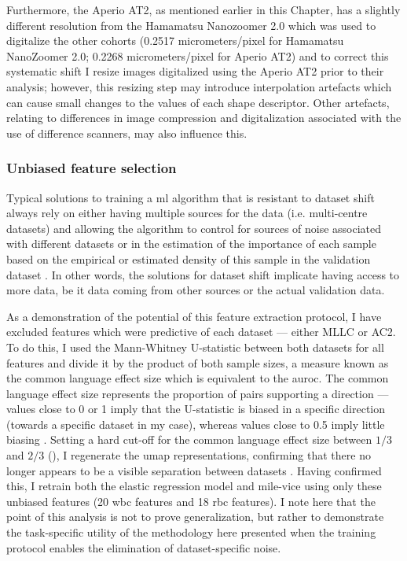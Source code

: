 Furthermore, the Aperio AT2, as mentioned earlier in this Chapter, has a slightly different resolution from the Hamamatsu Nanozoomer 2.0 which was used to digitalize the other cohorts (0.2517 micrometers/pixel for Hamamatsu NanoZoomer 2.0; 0.2268 micrometers/pixel for Aperio AT2) and to correct this systematic shift I resize images digitalized using the Aperio AT2 prior to their analysis; however, this resizing step may introduce interpolation artefacts which can cause small changes to the values of each shape descriptor. Other artefacts, relating to differences in image compression and digitalization associated with the use of difference scanners, may also influence this.

\subsubsection{Unbiased feature selection} 

Typical solutions to training a \ac{ml} algorithm that is resistant to dataset shift always rely on either having multiple sources for the data (i.e. multi-centre datasets) and allowing the algorithm to control for sources of noise associated with different datasets or in the estimation of the importance of each sample based on the empirical or estimated density of this sample in the validation dataset \cite{Y2019-vc}. In other words, the solutions for dataset shift implicate having access to more data, be it data coming from other sources or the actual validation data.

As a demonstration of the potential of this feature extraction protocol, I have excluded features which were predictive of each dataset --- either MLLC or AC2. To do this, I used the Mann-Whitney U-statistic between both datasets for all features and divide it by the product of both sample sizes, a measure known as the common language effect size which is equivalent to the \ac{auroc}. The common language effect size represents the proportion of pairs supporting a direction --- values close to 0 or 1 imply that the U-statistic is biased in a specific direction (towards a specific dataset in my case), whereas values close to 0.5 imply little biasing \cite{Kerby2014-fy}. Setting a hard cut-off for the common language effect size between $1/3$ and $2/3$ (), I regenerate the \ac{umap} representations, confirming that there no longer appears to be a visible separation between datasets . Having confirmed this, I retrain both the elastic regression model and \ac{mile-vice} using only these unbiased features (20 \ac{wbc} features and 18 \ac{rbc} features). I note here that the point of this analysis is not to prove generalization, but rather to demonstrate the task-specific utility of the methodology here presented when the training protocol enables the elimination of dataset-specific noise.

